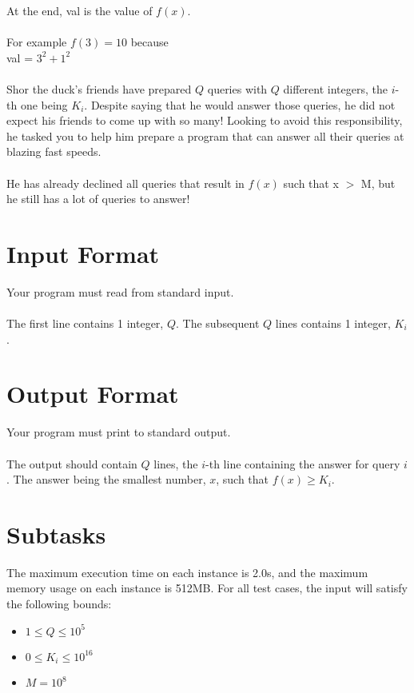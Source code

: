\documentclass{report}
\begin{document}
At the end, val is the value of $f(x)$.
\\\\
For example $f(3) = 10$ because
\\
val = $3^2 + 1^2$ 
\\\\
Shor the duck's friends have prepared $Q$ queries with $Q$ different integers, the $i$-th one being $K_i$. Despite saying that he would answer those queries, he did not expect his friends to come up with so many! Looking to avoid this responsibility, he tasked you to help him prepare a program that can answer all their queries at blazing fast speeds.
\\\\
He has already declined all queries that result in $f(x)$ such that x $>$ M, but he still has a lot of queries to answer!

\section*{Input Format}
Your program must read from standard input.
\\\\
The first line contains 1 integer, $Q$.
The subsequent $Q$ lines contains 1 integer, $K_i$.

\section*{Output Format}
Your program must print to standard output.
\\\\
The output should contain $Q$ lines, the $i$-th line containing the answer for query $i$. The answer being the smallest number, $x$, such that $f(x) \geq K_i$.

\pagebreak
\hfill \break \hfill \break

\section*{Subtasks}
The maximum execution time on each instance is 2.0s, and the maximum memory usage on each instance is 512MB. For all test cases, the input will satisfy the following bounds:

\begin{itemize}
    \item $1 \leq Q \leq 10^5$
    \item $0 \leq K_i \leq 10^{16}$
    \item $M = 10^8$
\end{itemize}
\end{document}
